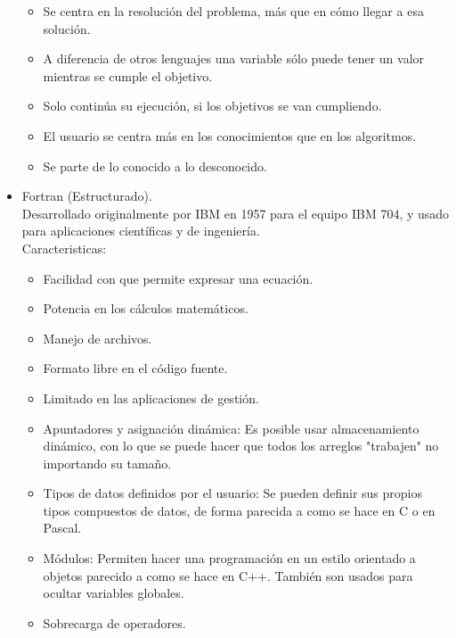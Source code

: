 \begin{itemize}
\begin{itemize}
		\item Se centra en la resolución del problema, más que en cómo llegar a esa solución.
		\item A diferencia de otros lenguajes una variable sólo puede tener un valor mientras se cumple el objetivo.
		\item Solo continúa su ejecución, si los objetivos se van cumpliendo.
		\item El usuario se centra más en los conocimientos que en los algoritmos.
		\item Se parte de lo conocido a lo desconocido.
	\end{itemize}
	\item Fortran (Estructurado).\\
	Desarrollado originalmente por IBM en 1957 para el equipo IBM 704, y usado para aplicaciones científicas y de ingeniería.\\
	Caracteristicas:
	\begin{itemize}
		\item Facilidad con que permite expresar una ecuación.
		\item Potencia en los cálculos matemáticos.
		\item Manejo de archivos.
		\item Formato libre en el código fuente.
		\item Limitado en las aplicaciones de gestión.
		\item Apuntadores y asignación dinámica: Es posible usar almacenamiento dinámico, con lo que se puede hacer que todos los arreglos "trabajen" no importando su tamaño.
		\item Tipos de datos definidos por el usuario: Se pueden definir sus propios tipos compuestos de datos, de forma parecida a como se hace en C o en Pascal.
		\item Módulos: Permiten hacer una programación en un estilo orientado a objetos parecido a como se hace en C++. También son usados para ocultar variables globales.
		\item Sobrecarga de operadores.
	\end{itemize}
	
\end{itemize}
